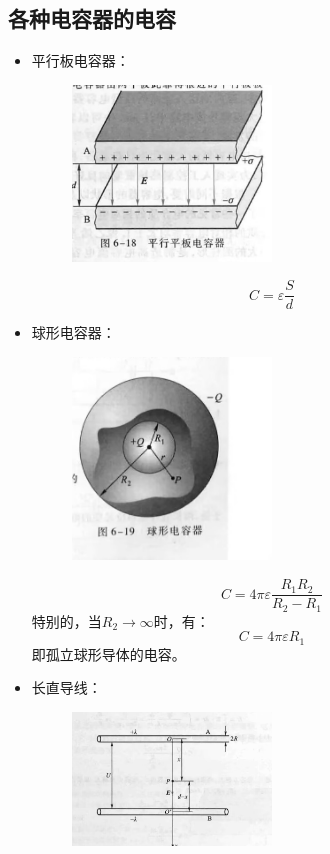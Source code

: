 \documentclass{ctexart}
\begin{document}
\subsection{各种电容器的电容}
\begin{itemize}
    \item 平行板电容器：
    \begin{figure}[H]
        \centering
        \includegraphics[width=0.5\textwidth]{img/6-18.jpg}
    \end{figure}
    $$
        C = \varepsilon \frac{S}{d}
    $$
    \item 球形电容器：
    \begin{figure}[H]
        \centering
        \includegraphics[width=0.5\textwidth]{img/6-19.jpg}
    \end{figure}
    $$
        C = 4\pi \varepsilon \frac{R_1R_2}{R_2 - R_1}
    $$
    特别的，当$R_2 \to \infty$时，有：
    $$
        C = 4\pi \varepsilon R_1
    $$
    即孤立球形导体的电容。
    \item 长直导线：
    \begin{figure}[H]
        \centering
        \includegraphics[width=0.5\textwidth]{img/6-20.jpg}

\end{figure}
\end{itemize}
\end{document}
